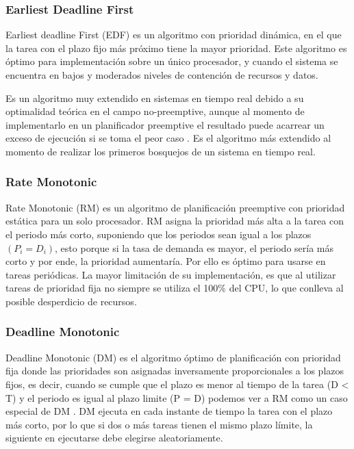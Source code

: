     \subsubsection{Earliest Deadline First} 
    Earliest deadline First (EDF) es un algoritmo con prioridad dinámica, en el que la tarea con el plazo fijo más próximo tiene la mayor prioridad. Este algoritmo es óptimo para implementación sobre un único procesador, y cuando el sistema se encuentra en bajos y moderados niveles de contención de recursos y datos\cite{Liu}.
\newline
     
    Es un algoritmo muy extendido en sistemas en tiempo real debido a su optimalidad teórica en el campo no-preemptive, aunque al momento de implementarlo en un planificador preemptive el resultado puede acarrear un exceso de ejecución si se toma el peor caso \cite{EmbSysDes}. Es el algoritmo más extendido al momento de realizar los primeros bosquejos de un sistema en tiempo real.
    
     \subsubsection{Rate Monotonic}
    Rate Monotonic (RM) es un algoritmo de planificación preemptive con prioridad estática para un solo procesador\cite{Liu}. RM asigna la prioridad más alta a la tarea con el periodo más corto, suponiendo que los periodos sean igual a los plazos \( (P_{i} = D_{i}) \), esto porque si la tasa de demanda es mayor, el periodo sería más corto y por ende, la prioridad aumentaría. Por ello es óptimo para usarse en tareas periódicas. La mayor limitación de su implementación, es que al utilizar tareas de prioridad fija no siempre se utiliza el 100\%  del CPU, lo que conlleva al posible desperdicio de recursos\cite{RM}.

\subsubsection{Deadline Monotonic}
Deadline Monotonic (DM) es el algoritmo óptimo de planificación con prioridad fija donde las prioridades son asignadas inversamente proporcionales a los plazos fijos, es decir, cuando se cumple que el plazo es menor al tiempo de la tarea (D < T) y el periodo es igual al plazo limite (P = D) podemos ver a RM como un caso especial de DM \cite{NPr}. DM ejecuta en cada instante de tiempo la tarea con el plazo más corto, por lo que si dos o más tareas tienen el mismo plazo límite, la siguiente en ejecutarse debe elegirse aleatoriamente.

